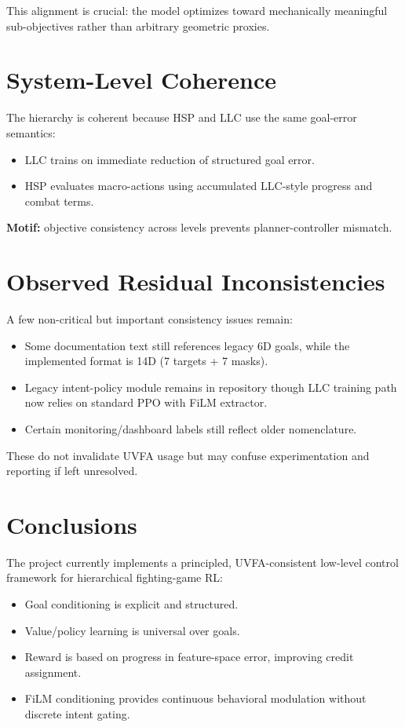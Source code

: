 \documentclass[11pt,a4paper]{article}
\begin{document}
This alignment is crucial: the model optimizes toward mechanically meaningful sub-objectives rather than arbitrary geometric proxies.

\section{System-Level Coherence}
The hierarchy is coherent because HSP and LLC use the same goal-error semantics:
\begin{itemize}[leftmargin=1.5em]
    \item LLC trains on immediate reduction of structured goal error.
    \item HSP evaluates macro-actions using accumulated LLC-style progress and combat terms.
\end{itemize}

\textbf{Motif:} objective consistency across levels prevents planner-controller mismatch.

\section{Observed Residual Inconsistencies}
A few non-critical but important consistency issues remain:
\begin{itemize}[leftmargin=1.5em]
    \item Some documentation text still references legacy 6D goals, while the implemented format is 14D (7 targets + 7 masks).
    \item Legacy intent-policy module remains in repository though LLC training path now relies on standard PPO with FiLM extractor.
    \item Certain monitoring/dashboard labels still reflect older nomenclature.
\end{itemize}

These do not invalidate UVFA usage but may confuse experimentation and reporting if left unresolved.

\section{Conclusions}
The project currently implements a principled, UVFA-consistent low-level control framework for hierarchical fighting-game RL:
\begin{itemize}[leftmargin=1.5em]
    \item Goal conditioning is explicit and structured.
    \item Value/policy learning is universal over goals.
    \item Reward is based on progress in feature-space error, improving credit assignment.
    \item FiLM conditioning provides continuous behavioral modulation without discrete intent gating.
\end{itemize}
\end{document}
